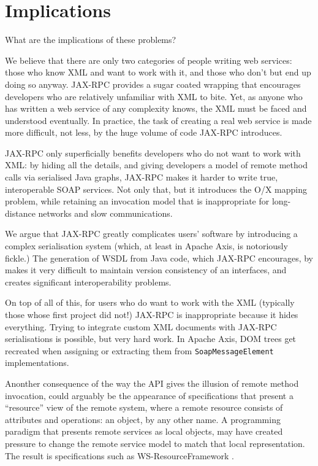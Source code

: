 \section{Implications}
\label{implications}

What are the implications of these problems?

We believe that there are only two categories of people writing web
services: those who know XML and want to work with it, and those who
don't but end up doing so anyway. JAX-RPC provides a sugar coated
wrapping that encourages developers who are relatively unfamiliar with
XML to bite. Yet, as anyone who has written a web service of any
complexity knows, the XML must be faced and understood eventually. In
practice, the task of creating a real web service is made more
difficult, not less, by the huge volume of code JAX-RPC introduces.

JAX-RPC only superficially benefits developers who do not want to work
with XML: by hiding all the details, and giving developers a model of
remote method calls via serialised Java graphs, JAX-RPC makes it harder
to write true, interoperable SOAP services. Not only that, but it
introduces the O/X mapping problem, while retaining an invocation model
that is inappropriate for long-distance networks and slow
communications.

We argue that JAX-RPC greatly complicates users' software
by introducing a complex serialisation system (which, at least in
Apache Axis, is notoriously fickle.) The generation of WSDL from Java
code, which JAX-RPC encourages, by makes it very difficult to
maintain version consistency of an interfaces, and creates significant
interoperability problems. 

On top of all of this, for users who do want to work with the XML
(typically those whose first project did not!) JAX-RPC is
inappropriate because it hides everything. Trying to integrate custom
XML documents with JAX-RPC serialisations is possible, but very hard
work. In Apache Axis, DOM trees get recreated when assigning or
extracting them from {\tt SoapMessageElement} implementations.

Anonther consequence of the way the API gives the illusion of remote method
invocation, could arguably be the appearance of specifications that present a
``resource'' view of the remote system, where a remote resource consists of 
attributes and operations: an object, by any other name. 
A programming paradigm that presents remote services as local objects, may have
created pressure to change the remote service model to match that local
representation. The result is specifications such as WS-ResourceFramework
\cite{spec:WSRF}.
 

